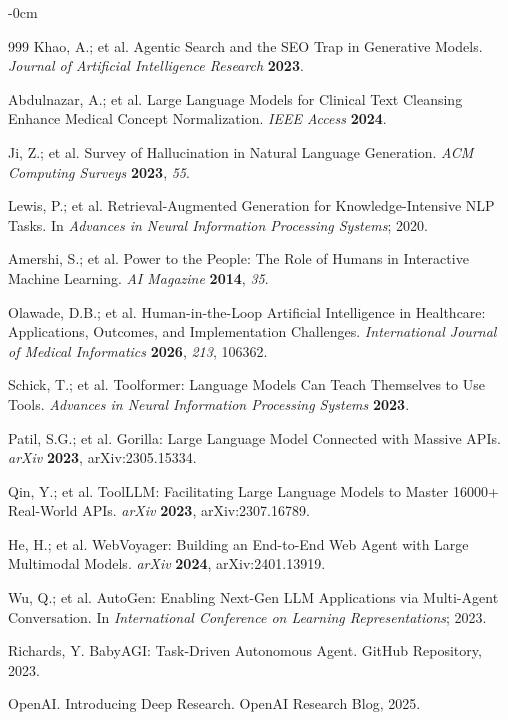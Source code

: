 \documentclass[journal,article,submit,moreauthors]{Definitions/mdpi}
\begin{document}
\begin{adjustwidth}{-\extralength}{0cm}
\begin{thebibliography}{999}
Khao, A.; et al. Agentic Search and the SEO Trap in Generative Models. \textit{Journal of Artificial Intelligence Research} \textbf{2023}.

Abdulnazar, A.; et al. Large Language Models for Clinical Text Cleansing Enhance Medical Concept Normalization. \textit{IEEE Access} \textbf{2024}.

Ji, Z.; et al. Survey of Hallucination in Natural Language Generation. \textit{ACM Computing Surveys} \textbf{2023}, \textit{55}.

Lewis, P.; et al. Retrieval-Augmented Generation for Knowledge-Intensive NLP Tasks. In \textit{Advances in Neural Information Processing Systems}; 2020.

Amershi, S.; et al. Power to the People: The Role of Humans in Interactive Machine Learning. \textit{AI Magazine} \textbf{2014}, \textit{35}.

Olawade, D.B.; et al. Human-in-the-Loop Artificial Intelligence in Healthcare: Applications, Outcomes, and Implementation Challenges. \textit{International Journal of Medical Informatics} \textbf{2026}, \textit{213}, 106362.

Schick, T.; et al. Toolformer: Language Models Can Teach Themselves to Use Tools. \textit{Advances in Neural Information Processing Systems} \textbf{2023}.

Patil, S.G.; et al. Gorilla: Large Language Model Connected with Massive APIs. \textit{arXiv} \textbf{2023}, arXiv:2305.15334.

Qin, Y.; et al. ToolLLM: Facilitating Large Language Models to Master 16000+ Real-World APIs. \textit{arXiv} \textbf{2023}, arXiv:2307.16789.

He, H.; et al. WebVoyager: Building an End-to-End Web Agent with Large Multimodal Models. \textit{arXiv} \textbf{2024}, arXiv:2401.13919.

Wu, Q.; et al. AutoGen: Enabling Next-Gen LLM Applications via Multi-Agent Conversation. In \textit{International Conference on Learning Representations}; 2023.

Richards, Y. BabyAGI: Task-Driven Autonomous Agent. GitHub Repository, 2023.

OpenAI. Introducing Deep Research. OpenAI Research Blog, 2025.


\end{thebibliography}
\end{adjustwidth}
\end{document}
